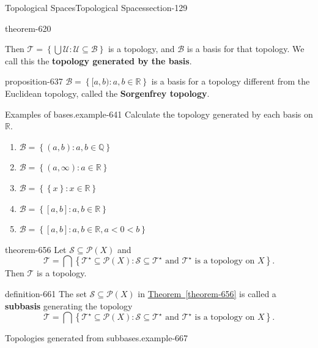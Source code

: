 \documentclass[oneside,10pt,]{article}
\newcommand{\terminology}[1]{\textbf{#1}}
\newcommand{\mb}{\mathbb}
\newcommand{\mc}{\mathcal}
\newcommand{\setBuilder}[2]{\left\{#1:#2\right\}}
\newcommand{\setList}[1]{\left\{#1\right\}}
\newcommand{\lt}{<}
\begin{document}
\begin{sectionptx}{Topological Spaces}{}{Topological Spaces}{}{}{section-129}
\begin{theorem}{}{}{theorem-620}
\begin{enumerate}
\end{enumerate}
\hypertarget{p-633}{}%
Then \(\mc T=\setBuilder{\bigcup\mc U}{\mc U\subseteq\mc B}\) is a topology, and \(\mc B\) is a basis for that topology. We call this the \terminology{topology generated by the basis}.%
\end{theorem}
\begin{proposition}{}{}{proposition-637}%
\hypertarget{p-638}{}%
\(\mc B=\setBuilder{[a,b)}{a,b\in\mb R}\) is a basis for a topology different from the Euclidean topology, called the \terminology{Sorgenfrey topology}.%
\end{proposition}
\begin{example}{Examples of bases.}{example-641}%
\hypertarget{p-643}{}%
Calculate the topology generated by each basis on \(\mb R\).%
\leavevmode%
\begin{enumerate}
\item\hypertarget{li-646}{}\(\mc B=\setBuilder{(a,b)}{a,b\in\mb Q}\)%
\item\hypertarget{li-648}{}\(\mc B=\setBuilder{(a,\infty)}{a\in\mb R}\)%
\item\hypertarget{li-650}{}\(\mc B=\setBuilder{\setList{x}}{x\in\mb R}\)%
\item\hypertarget{li-652}{}\(\mc B=\setBuilder{[a,b]}{a,b\in\mb R}\)%
\item\hypertarget{li-654}{}\(\mc B=\setBuilder{[a,b]}{a,b\in\mb R,a\lt0\lt b}\)%
\end{enumerate}
\end{example}
\begin{theorem}{}{}{theorem-656}%
\hypertarget{p-657}{}%
Let \(\mc S\subseteq\mc P(X)\) and%
\begin{equation*}
\mc T=\bigcap\setBuilder{\mc T^\star\subseteq\mc P(X)}{\mc S\subseteq\mc T^\star \text{ and }
\mc T^\star \text{ is a topology on } X}.
\end{equation*}
Then \(\mc T\) is a topology.%
\end{theorem}
\begin{definition}{}{definition-661}%
\hypertarget{p-662}{}%
The set \(\mc S\subseteq\mc P(X)\) in \hyperref[theorem-656]{Theorem~\ref{theorem-656}} is called a \terminology{subbasis} generating the topology%
\begin{equation*}
\mc T=\bigcap\setBuilder{\mc T^\star\subseteq\mc P(X)}{\mc S\subseteq\mc T^\star \text{ and }
\mc T^\star \text{ is a topology on } X}.
\end{equation*}
%
\end{definition}
\begin{example}{Topologies generated from subbases.}{example-667}%

\end{example}
\end{sectionptx}
\end{document}
